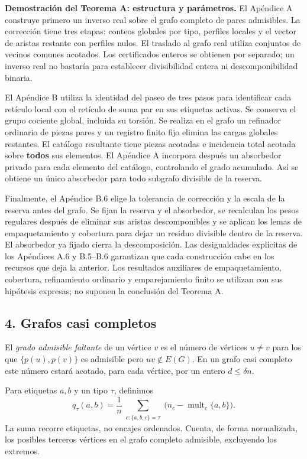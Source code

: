 \documentclass[spanish,11pt,a4paper]{article}
\begin{document}
\textbf{Demostración del Teorema A: estructura y parámetros.} El Apéndice A construye primero un inverso real sobre el grafo completo de pares admisibles. La corrección tiene tres etapas: conteos globales por tipo, perfiles locales y el vector de aristas restante con perfiles nulos. El traslado al grafo real utiliza conjuntos de vecinos comunes acotados. Los certificados enteros se obtienen por separado; un inverso real no bastaría para establecer divisibilidad entera ni descomponibilidad binaria.

El Apéndice B utiliza la identidad del paseo de tres pasos para identificar cada retículo local con el retículo de suma par en sus etiquetas activas. Se conserva el grupo cociente global, incluida su torsión. Se realiza en el grafo un refinador ordinario de piezas pares y un registro finito fijo elimina las cargas globales restantes. El catálogo resultante tiene piezas acotadas e incidencia total acotada sobre \textbf{todos} sus elementos. El Apéndice A incorpora después un absorbedor privado para cada elemento del catálogo, controlando el grado acumulado. Así se obtiene un único absorbedor para todo subgrafo divisible de la reserva.

Finalmente, el Apéndice B.6 elige la tolerancia de corrección y la escala de la reserva antes del grafo. Se fijan la reserva y el absorbedor, se recalculan los pesos regulares después de eliminar sus aristas descomponibles y se aplican los lemas de empaquetamiento y cobertura para dejar un residuo divisible dentro de la reserva. El absorbedor ya fijado cierra la descomposición. Las desigualdades explícitas de los Apéndices A.6 y B.5--B.6 garantizan que cada construcción cabe en los recursos que deja la anterior. Los resultados auxiliares de empaquetamiento, cobertura, refinamiento ordinario y emparejamiento finito se utilizan con sus hipótesis expresas; no suponen la conclusión del Teorema A.


\subsection{4. Grafos casi completos}\label{grafos-casi-completos}

El \emph{grado admisible faltante} de un vértice \(v\) es el número de vértices \(u\ne v\) para los que \(\{p(u),p(v)\}\) es admisible pero \(uv\notin E(G)\). En un grafo casi completo este número estará acotado, para cada vértice, por un entero \(d\le\delta n\).

Para etiquetas \(a,b\) y un tipo \(\tau\), definimos \[q_\tau(a,b)=\frac1n
\sum_{\substack{c:\{a,b,c\}=\tau}}
\bigl(n_c-\operatorname{mult}_c\{a,b\}\bigr).
\tag{4.1}\] La suma recorre etiquetas, no encajes ordenados. Cuenta, de forma normalizada, los posibles terceros vértices en el grafo completo admisible, excluyendo los extremos.
\end{document}
